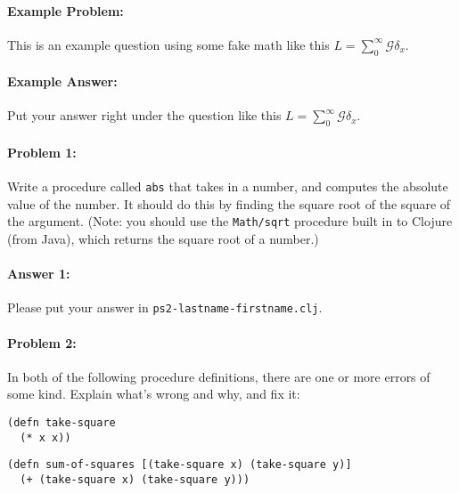 \documentclass[10pt]{article}
\newcommand{\PSnum}{2}
\begin{document}
\noindent\hrulefill %

\paragraph{Example Problem:}
This is an example question using some fake math like this
$L=\sum_0^{\infty} \mathcal{G} \delta_x$.

\paragraph{Example Answer:} Put your answer right under the question like
this $L=\sum_0^{\infty} \mathcal{G} \delta_x$.


\noindent\hrulefill %

\paragraph{Problem 1:}
Write a procedure called \texttt{abs} that takes in a number, and
computes the absolute value of the number. It should do this by
finding the square root of the square of the argument. (Note: you
should use the \texttt{Math/sqrt} procedure built in to Clojure (from Java), which
returns the square root of a number.)

\paragraph{Answer 1:} Please put your answer in \texttt{ps\PSnum-lastname-firstname.clj}.

\noindent\hrulefill %

\paragraph{Problem 2:}
In both of the following procedure definitions, there are one or more errors of
some kind. Explain what's wrong and why, and fix it:

\begin{lstlisting}
(defn take-square
  (* x x))
\end{lstlisting}

\begin{lstlisting}
(defn sum-of-squares [(take-square x) (take-square y)]
  (+ (take-square x) (take-square y)))
\end{lstlisting}
\end{document}
